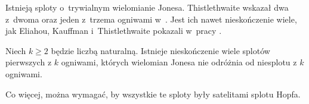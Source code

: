 Istnieją sploty o~trywialnym wielomianie Jonesa.
Thistlethwaite wskazał dwa z~dwoma oraz jeden z~trzema ogniwami w~\cite{thistlethwaite01}.
Jest ich nawet nieskończenie wiele, jak Eliahou, Kauffman i~Thistlethwaite pokazali w~pracy \cite{eliahou03}.
%
%
%

\begin{proposition}
%
%
    Niech $k \ge 2$ będzie liczbą naturalną.
    Istnieje nieskończenie wiele splotów pierwszych z $k$ ogniwami, których wielomian Jonesa nie odróżnia od niesplotu z $k$ ogniwami.

    Co więcej, można wymagać, by wszystkie te sploty były satelitami splotu Hopfa.
\end{proposition}

